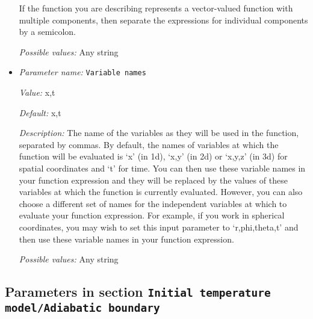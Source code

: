 \begin{itemize}
If the function you are describing represents a vector-valued function with multiple components, then separate the expressions for individual components by a semicolon.


{\it Possible values:} Any string
\item {\it Parameter name:} {\tt Variable names}
\label{parameters:Initial temperature model/Adiabatic/Function/Variable names}


{\it Value:} x,t


{\it Default:} x,t


{\it Description:} The name of the variables as they will be used in the function, separated by commas. By default, the names of variables at which the function will be evaluated is `x' (in 1d), `x,y' (in 2d) or `x,y,z' (in 3d) for spatial coordinates and `t' for time. You can then use these variable names in your function expression and they will be replaced by the values of these variables at which the function is currently evaluated. However, you can also choose a different set of names for the independent variables at which to evaluate your function expression. For example, if you work in spherical coordinates, you may wish to set this input parameter to `r,phi,theta,t' and then use these variable names in your function expression.


{\it Possible values:} Any string
\end{itemize}

\subsection{Parameters in section \tt Initial temperature model/Adiabatic boundary}
\label{parameters:Initial_20temperature_20model/Adiabatic_20boundary}

